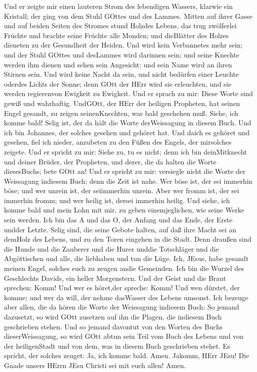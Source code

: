  Und er zeigte mir einen lauteren Strom des lebendigen
Wassers, klarwie ein Kristall; der ging von dem Stuhl GOttes und des
Lammes.  Mitten auf ihrer Gasse und auf beiden Seiten des
Stromes stund Holzdes Lebens, das trug zwölferlei Früchte und brachte
seine Früchte alle Monden; und dieBlätter des Holzes dieneten zu der
Gesundheit der Heiden.  Und wird kein Verbannetes mehr sein;
und der Stuhl GOttes und desLammes wird darinnen sein; und seine Knechte
werden ihm dienen  und sehen sein Angesicht; und sein Name
wird an ihren Stirnen sein.  Und wird keine Nacht da sein,
und nicht bedürfen einer Leuchte oderdes Lichts der Sonne; denn GOtt der
HErr wird sie erleuchten, und sie werden regierenvon Ewigkeit zu
Ewigkeit.  Und er sprach zu mir: Diese Worte sind gewiß und
wahrhaftig. UndGOtt, der HErr der heiligen Propheten, hat seinen Engel
gesandt, zu zeigen seinenKnechten, was bald geschehen muß. 
Siehe, ich komme bald! Selig ist, der da hält die Worte derWeissagung in
diesem Buch.  Und ich bin Johannes, der solches gesehen und
gehöret hat. Und daich es gehöret und gesehen, fiel ich nieder,
anzubeten zu den Füßen des Engels, der mirsolches zeigete. 
Und er spricht zu mir: Siehe zu, tu es nicht; denn ich bin deinMitknecht
und deiner Brüder, der Propheten, und derer, die da halten die Worte
diesesBuchs; bete GOtt an!  Und er spricht zu mir:
versiegle nicht die Worte der Weissagung indiesem Buch; denn die Zeit
ist nahe.  Wer böse ist, der sei immerhin böse; und wer
unrein ist, der seiimmerhin unrein. Aber wer fromm ist, der sei immerhin
fromm; und wer heilig ist, dersei immerhin heilig.  Und
siehe, ich komme bald und mein Lohn mit mir, zu geben einemjeglichen,
wie seine Werke sein werden.  Ich bin das A und das O, der
Anfang und das Ende, der Erste undder Letzte.  Selig sind,
die seine Gebote halten, auf daß ihre Macht sei an demHolz des Lebens,
und zu den Toren eingehen in die Stadt.  Denn draußen sind
die Hunde und die Zauberer und die Hurer unddie Totschläger und die
Abgöttischen und alle, die liebhaben und tun die Lüge. 
Ich, JEsus, habe gesandt meinen Engel, solches euch zu zeugen andie
Gemeinden. Ich bin die Wurzel des Geschlechts Davids, ein heller
Morgenstern.  Und der Geist und die Braut sprechen: Komm!
Und wer es höret,der spreche: Komm! Und wen dürstet, der komme; und wer
da will, der nehme dasWasser des Lebens umsonst.  Ich
bezeuge aber allen, die da hören die Worte der Weissagung indiesem Buch:
So jemand dazusetzt, so wird GOtt zusetzen auf ihn die Plagen, die
indiesem Buch geschrieben stehen.  Und so jemand davontut
von den Worten des Buchs dieserWeissagung, so wird GOtt abtun sein Teil
vom Buch des Lebens und von der heiligenStadt und von dem, was in diesem
Buch geschrieben stehet.  Es spricht, der solches zeuget:
Ja, ich komme bald. Amen. Jakomm, HErr JEsu!  Die Gnade
unsers HErrn JEsu Christi sei mit euch allen! Amen.
